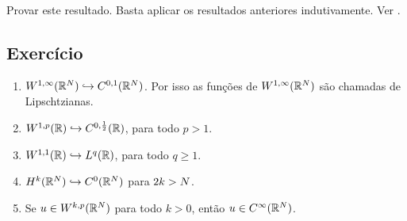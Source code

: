\begin{frame}

\begin{exer}
Provar este resultado. Basta aplicar os resultados anteriores indutivamente. Ver \cite{evans}.
\end{exer}
\subsection*{Exercício \theexer}

\begin{exe}
\begin{enumerate}
\item \(W^{1,\infty}(\mathbb{R}^N)\hookrightarrow C^{0,1}(\mathbb{R}^N)\). Por isso as funções de  \(W^{1,\infty}(\mathbb{R}^N)\) são chamadas de Lipschtzianas.
\item \(W^{1,p}(\mathbb{R})\hookrightarrow C^{0,\frac{1}{2}}(\mathbb{R})\), para todo \(p>1\). 

\item  \(W^{1,1}(\mathbb{R})\hookrightarrow L^q(\mathbb{R}) \), para todo \(q\geq 1\). 

\item \(H^k(\mathbb{R}^N)\hookrightarrow C^0(\mathbb{R}^N)\) para \(2k>N\). 

\item  Se \(u\in W^{k,p}(\mathbb{R}^N)\) para todo \(k>0\), então \(u\in C^\infty(\mathbb{R}^N)\).
\end{enumerate}
\end{exe}
\end{frame}


